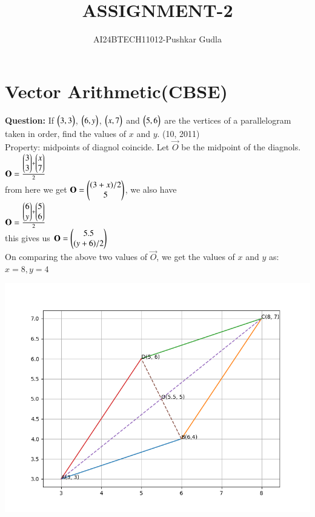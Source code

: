 \documentclass[journal,12pt,onecolumn]{IEEEtran}
\theoremstyle{remark}
\begin{document}

\vspace{3cm}

\title{ASSIGNMENT-2}
\author{AI24BTECH11012-Pushkar Gudla}
\maketitle
\bigskip
\section*{\textbf{Vector Arithmetic(CBSE)}}

\textbf{Question:} If $\begin{pmatrix}3,3\end{pmatrix}$, $\begin{pmatrix}6,y\end{pmatrix}$, $\begin{pmatrix}x,7\end{pmatrix}$ and $\begin{pmatrix}5,6\end{pmatrix}$ are the vertices of a parallelogram taken in order, find the values of $x$ and $y$. 
		\hfill{(10, 2011)}\\

		\solution Property: midpoints of diagnol coincide. Let $\vec{O}$ be the midpoint of the diagnols.\\

		$\mathbf{O}=\frac{\begin{pmatrix}3\\3\end{pmatrix}+\begin{pmatrix}x\\7\end{pmatrix}}{2}$\\
		from here we get $\mathbf{O}=\begin{pmatrix}(3+x)/2 \\ 5\end{pmatrix}$, we also have\\
		$\mathbf{O}=\frac{\begin{pmatrix}6\\y\end{pmatrix}+\begin{pmatrix}5\\6\end{pmatrix}}{2}$\\
		this gives us $\mathbf{O}=\begin{pmatrix}5.5\\(y+6)/2\end{pmatrix}$\\
		On comparing the above two values of $\vec{O}$, we get the values of $x$ and $y$ as:\\
		$x=8, y=4$\\
\graphicspath{ {./figs/} }
		\includegraphics[scale=0.7]{parallelogram}
\end{document}
